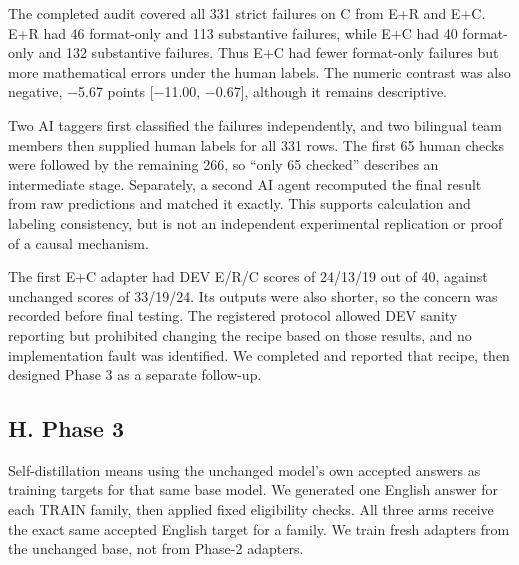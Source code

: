 \medskip{}\par\nopagebreak

The completed audit covered all 331 strict failures on C from E+R and E+C. E+R had 46 format-only and 113 substantive failures, while E+C had 40 format-only and 132 substantive failures. Thus E+C had fewer format-only failures but more mathematical errors under the human labels. The numeric contrast was also negative, −5.67 points [−11.00, −0.67], although it remains descriptive.

\medskip{}\par\nopagebreak

Two AI taggers first classified the failures independently, and two bilingual team members then supplied human labels for all 331 rows. The first 65 human checks were followed by the remaining 266, so “only 65 checked” describes an intermediate stage. Separately, a second AI agent recomputed the final result from raw predictions and matched it exactly. This supports calculation and labeling consistency, but is not an independent experimental replication or proof of a causal mechanism.

\medskip{}\par\nopagebreak

The first E+C adapter had DEV E/R/C scores of 24/13/19 out of 40, against unchanged scores of 33/19/24. Its outputs were also shorter, so the concern was recorded before final testing. The registered protocol allowed DEV sanity reporting but prohibited changing the recipe based on those results, and no implementation fault was identified. We completed and reported that recipe, then designed Phase 3 as a separate follow-up.

\subsection*{H. Phase 3}


\medskip{}\par\nopagebreak

Self-distillation means using the unchanged model's own accepted answers as training targets for that same base model. We generated one English answer for each TRAIN family, then applied fixed eligibility checks. All three arms receive the exact same accepted English target for a family. We train fresh adapters from the unchanged base, not from Phase-2 adapters.

